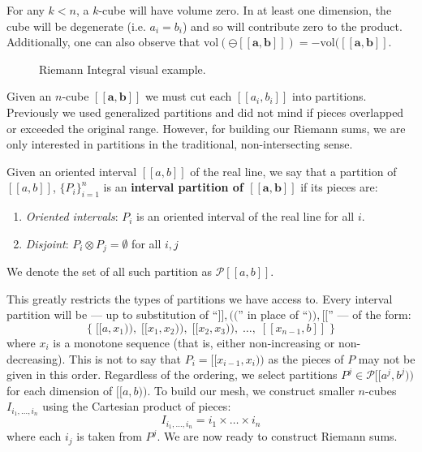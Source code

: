 For any $k<n$, a $k$-cube will have volume zero.
In at least one dimension, the cube will be degenerate (i.e. $a_i = b_i$) and so will contribute zero to the product.
Additionally, one can also observe that $\text{vol}( \ominus [\![\boldsymbol{a}, \boldsymbol{b} ]\!]) = - \text{vol}( [\![ \boldsymbol{a}, \boldsymbol{b} ]\!]$.


\begin{figure}[h]
\caption[Riemann Integral]{Riemann Integral visual example.}
\centering
{}
\end{figure}

Given an $n$-cube $[\![\boldsymbol{a}, \boldsymbol{b}]\!]$ we must cut each $[\![a_i, b_i]\!]$ into partitions.
Previously we used generalized partitions and did not mind if pieces overlapped or exceeded the original range.
However, for building our Riemann sums, we are only interested in partitions in the traditional, non-intersecting sense.

\begin{definition}
	Given an oriented interval $[\![a,b]\!]$ of the real line, we say that a partition of $[\![a,b]\!]$, $\{P_i\}_{i=1}^n$
	is an \textbf{interval partition of $\boldsymbol{[\![a,b]\!]}$} if its pieces are:
	\begin{enumerate}
		\item \emph{Oriented intervals}: $P_i$ is an oriented interval of the real line for all $i$.
		\item \emph{Disjoint}: $P_i \otimes P_j = \emptyset$ for all $i,j$
	\end{enumerate}
	We denote the set of all such partition as $\mathcal{P}[\![a,b]\!]$.
\end{definition}

This greatly restricts the types of partitions we have access to.
Every interval partition will be --- up to substitution of ``$]\!], (\!($'' in place of ``$)\!), [\![$'' --- of the form:
\begin{equation}
	\Big\{ \; [\![a,x_1)\!), \; [\![x_1, x_2)\!), \; [\![x_2, x_3)\!),\; \ldots,\; [\![x_{n-1}, b]\!] \; \Big\}
\end{equation}
where $x_i$ is a monotone sequence (that is, either non-increasing or non-decreasing).
This is not to say that $P_i = [\![x_{i-1}, x_i )\!)$ as the pieces of $P$ may not be given in this order.
Regardless of the ordering, we select partitions $P^j \in \mathcal{P}[\![a^j,b^j)\!)$ for each dimension of $[\![a,b)\!)$.
To build our mesh, we construct smaller $n$-cubes $I_{i_1, \ldots, i_n}$ using the Cartesian product of pieces:
\begin{equation}
	I_{i_1, \ldots, i_n} = i_1 \times \ldots \times i_n
\end{equation}
where each $i_j$ is taken from $P^j$.
We are now ready to construct Riemann sums.

